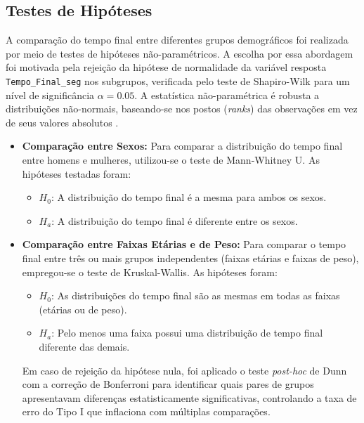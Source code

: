 \subsection{Testes de Hipóteses}

A comparação do tempo final entre diferentes grupos demográficos foi realizada por meio de testes de hipóteses não-paramétricos. A escolha por essa abordagem foi motivada pela rejeição da hipótese de normalidade da variável resposta \texttt{Tempo\_Final\_seg} nos subgrupos, verificada pelo teste de Shapiro-Wilk para um nível de significância $\alpha = 0.05$. A estatística não-paramétrica é robusta a distribuições não-normais, baseando-se nos postos (\textit{ranks}) das observações em vez de seus valores absolutos \citep{siegel1988}.

\begin{itemize}
    \item \textbf{Comparação entre Sexos:} Para comparar a distribuição do tempo final entre homens e mulheres, utilizou-se o teste de Mann-Whitney U. As hipóteses testadas foram:
    \begin{itemize}
        \item $H_0$: A distribuição do tempo final é a mesma para ambos os sexos.
        \item $H_a$: A distribuição do tempo final é diferente entre os sexos.
    \end{itemize}
    
    \item \textbf{Comparação entre Faixas Etárias e de Peso:} Para comparar o tempo final entre três ou mais grupos independentes (faixas etárias e faixas de peso), empregou-se o teste de Kruskal-Wallis. As hipóteses foram:
    \begin{itemize}
        \item $H_0$: As distribuições do tempo final são as mesmas em todas as faixas (etárias ou de peso).
        \item $H_a$: Pelo menos uma faixa possui uma distribuição de tempo final diferente das demais.
    \end{itemize}
    Em caso de rejeição da hipótese nula, foi aplicado o teste \textit{post-hoc} de Dunn com a correção de Bonferroni para identificar quais pares de grupos apresentavam diferenças estatisticamente significativas, controlando a taxa de erro do Tipo I que inflaciona com múltiplas comparações.
\end{itemize}

